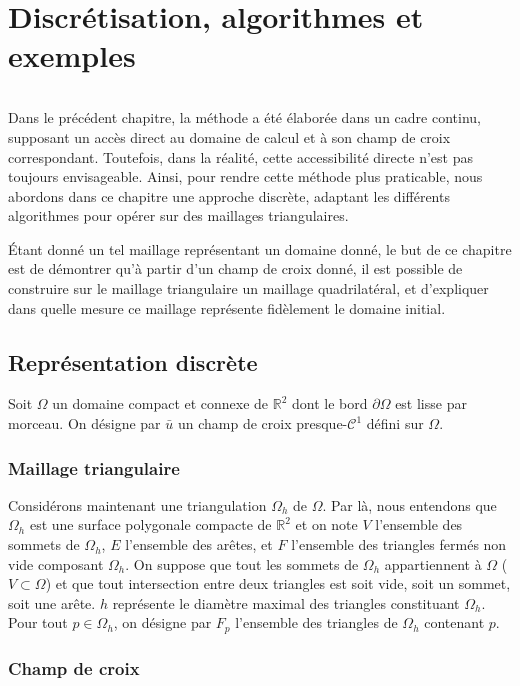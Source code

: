 \chapter{Discrétisation, algorithmes et exemples}
\label{chap:alorithme}
\minitoc

\[\]

Dans le précédent chapitre, la méthode a été élaborée dans un cadre continu, supposant un accès direct au domaine de calcul et à son champ de croix correspondant. Toutefois, dans la réalité, cette accessibilité directe n'est pas toujours envisageable. Ainsi, pour rendre cette méthode plus praticable, nous abordons dans ce chapitre une approche discrète, adaptant les différents algorithmes pour opérer sur des maillages triangulaires.

\'Etant donné un tel maillage représentant un domaine donné, le but de ce chapitre est de démontrer qu'à partir d'un champ de croix donné, il est possible de construire sur le maillage triangulaire un maillage quadrilatéral, et d'expliquer dans quelle mesure ce maillage représente fidèlement le domaine initial.

\section{Représentation discrète}

Soit $\Omega$ un domaine compact et connexe de $\mathbb{R}^2$ dont le bord $\partial\Omega$ est lisse par morceau. On désigne par $\bar{u}$ un champ de croix presque-$\mathcal{C}^1$ défini sur $\Omega$.

\subsection{Maillage triangulaire}

Considérons maintenant une triangulation $\Omega_h$ de $\Omega$. Par là, nous entendons que $\Omega_h$ est une surface polygonale compacte de $\mathbb{R}^2$ et on note $V$ l'ensemble des sommets de $\Omega_h$, $E$ l'ensemble des arêtes, et $F$ l'ensemble des triangles fermés non vide composant $\Omega_h$. On suppose que tout les sommets de $\Omega_h$ appartiennent à $\Omega$ ($V\subset\Omega$) et que tout intersection entre deux triangles est soit vide, soit un sommet, soit une arête. $h$ représente le diamètre maximal des triangles constituant $\Omega_h$. Pour tout $p\in\Omega_h$, on désigne par $F_p$ l'ensemble des triangles de $\Omega_h$ contenant $p$.

\subsection{Champ de croix}

